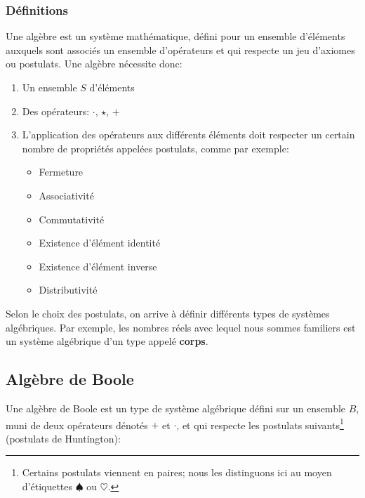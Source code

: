 \documentclass[11pt]{article}
\begin{document}
\subsubsection{Définitions}
\label{sec:orgf41e77f}

Une algèbre est un système mathématique, défini pour un ensemble
d'éléments auxquels sont associés un ensemble d'opérateurs et qui
respecte un jeu d'axiomes ou postulats. Une algèbre nécessite donc:

\begin{enumerate}
\item Un ensemble \(S\) d'éléments

\item Des opérateurs: \(\cdot\), \(\star\), \(+\)

\item L'application des opérateurs aux différents éléments doit respecter
un certain nombre de propriétés appelées postulats, comme par exemple:

\begin{itemize}
\item Fermeture

\item Associativité

\item Commutativité

\item Existence d'élément identité

\item Existence d'élément inverse

\item Distributivité
\end{itemize}
\end{enumerate}

Selon le choix des postulats, on arrive à définir différents types de
systèmes algébriques. Par exemple, les nombres réels avec lequel nous
sommes familiers est un système algébrique d'un type appelé \textbf{corps}.

\subsection{Algèbre de Boole}
\label{sec:org453afe0}

Une algèbre de Boole est un type de système algébrique défini sur un
ensemble \(B\), muni de deux opérateurs dénotés \(+\) et \(\cdot\), et qui
respecte les postulats suivants\footnote{Certains postulats viennent en paires; nous les distinguons ici au
moyen d'étiquettes \(\spadesuit\) ou \(\heartsuit\).} (postulats de Huntington):
\end{document}

